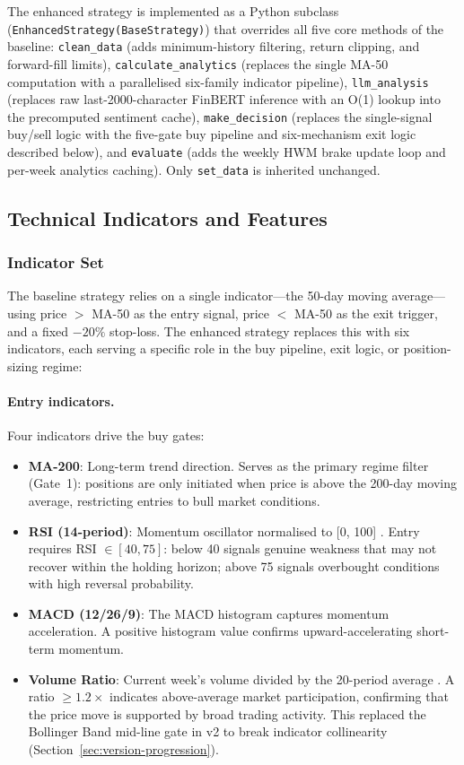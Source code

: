 \documentclass[11pt,twoside,a4paper]{article}
\begin{document}
The enhanced strategy is implemented as a Python subclass (\texttt{EnhancedStrategy(BaseStrategy)}) that overrides all five core methods of the baseline: \texttt{clean\_data} (adds minimum-history filtering, return clipping, and forward-fill limits), \texttt{calculate\_analytics} (replaces the single MA-50 computation with a parallelised six-family indicator pipeline), \texttt{llm\_analysis} (replaces raw last-2000-character FinBERT inference with an O(1) lookup into the precomputed sentiment cache), \texttt{make\_decision} (replaces the single-signal buy/sell logic with the five-gate buy pipeline and six-mechanism exit logic described below), and \texttt{evaluate} (adds the weekly HWM brake update loop and per-week analytics caching). Only \texttt{set\_data} is inherited unchanged.

\subsection{Technical Indicators and Features}

\subsubsection{Indicator Set}

The baseline strategy relies on a single indicator---the 50-day moving average---using price $>$ MA-50 as the entry signal, price $<$ MA-50 as the exit trigger, and a fixed $-20\%$ stop-loss. The enhanced strategy replaces this with six indicators, each serving a specific role in the buy pipeline, exit logic, or position-sizing regime:

\paragraph{Entry indicators.}
Four indicators drive the buy gates:

\begin{itemize}
    \item \textbf{MA-200}: Long-term trend direction. Serves as the primary regime filter (Gate~1): positions are only initiated when price is above the 200-day moving average, restricting entries to bull market conditions.
    \item \textbf{RSI (14-period)}: Momentum oscillator normalised to [0, 100] \citep{Wilder1978}. Entry requires RSI $\in [40, 75]$: below 40 signals genuine weakness that may not recover within the holding horizon; above 75 signals overbought conditions with high reversal probability.
    \item \textbf{MACD (12/26/9)}: The MACD histogram captures momentum acceleration. A positive histogram value confirms upward-accelerating short-term momentum.
    \item \textbf{Volume Ratio}: Current week's volume divided by the 20-period average \citep{Blume1994}. A ratio $\geq 1.2\times$ indicates above-average market participation, confirming that the price move is supported by broad trading activity. This replaced the Bollinger Band mid-line gate in v2 to break indicator collinearity (Section~\ref{sec:version-progression}).
\end{itemize}
\end{document}
